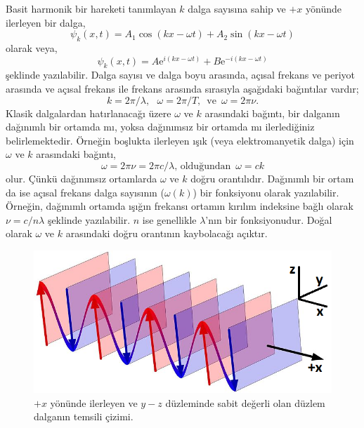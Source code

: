 \documentclass[a4paper,12pt, twoside]{article}
\begin{document}
Basit harmonik bir hareketi tanımlayan $k$ dalga sayısına sahip ve $+x$ yönünde ilerleyen bir dalga,
\begin{equation}
\psi_k(x, t) = A_1 \cos(kx - \omega t) + A_2 \sin(kx - \omega t)
\label{eq:plane_sin_wave}
\end{equation}
olarak veya,
\begin{equation}
\psi_k(x, t) = A \text{e}^{i(kx - \omega t)} + B \text{e}^{-i(kx - \omega t)}
\label{eq:plane_exp_wave}
\end{equation}
şeklinde yazılabilir. Dalga sayısı ve dalga boyu arasında, açısal frekans ve periyot arasında ve açısal frekans ile frekans arasında sırasıyla aşağıdaki bağıntılar vardır;
\begin{equation}
k = 2\pi/\lambda, \,\,\,\, \omega = 2\pi/T,\,\,\, \text{ve}\,\,\, \omega = 2\pi\nu.
\label{eq:wave_length_number}
\end{equation}
Klasik dalgalardan hatırlanacağı üzere $\omega$ ve $k$ arasındaki bağıntı, bir dalganın dağınımlı bir ortamda mı, yoksa dağınımsız bir ortamda mı ilerlediğiniz belirlemektedir. Örneğin boşlukta ilerleyen ışık (veya elektromanyetik dalga) için $\omega$ ve $k$ arasındaki bağıntı,
\begin{equation}
\omega = 2\pi \nu = 2 \pi c/\lambda \text{, olduğundan }\, \omega = c k
\label{eq:w_k_relation}
\end{equation}
olur. Çünkü dağınımsız ortamlarda $\omega$ ve $k$ doğru orantılıdır. Dağınımlı bir ortam da ise açısal frekans dalga sayısının ($\omega(k)$) bir fonksiyonu olarak yazılabilir. Örneğin, dağınımlı ortamda ışığın frekansı ortamın kırılım indeksine bağlı olarak $\nu = c/n\lambda$ şeklinde yazılabilir. $n$ ise genellikle $\lambda$'nın bir fonksiyonudur. Doğal olarak $\omega$ ve $k$ arasındaki doğru orantının kaybolacağı açıktır.
\begin{figure}[hbtp]
\center
\includegraphics[scale=1.5]{Plane_Wave_Oblique_View.png}
\caption{$+x$ yönünde ilerleyen ve $y-z$ düzleminde sabit değerli olan düzlem dalganın temsili çizimi.}
\label{fig:plane_wave}
\end{figure}
\end{document}
